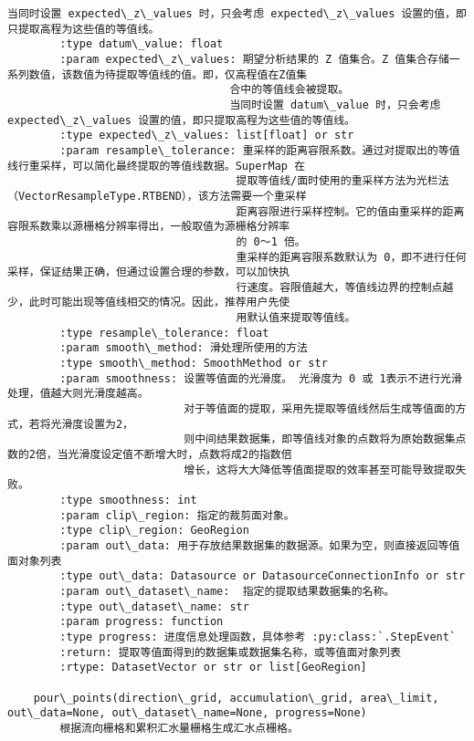 \documentclass[11pt]{article}
\begin{document}
\begin{Verbatim}[commandchars=\\\{\}]
                            当同时设置 expected\_z\_values 时，只会考虑 expected\_z\_values 设置的值，即只提取高程为这些值的等值线。
        :type datum\_value: float
        :param expected\_z\_values: 期望分析结果的 Z 值集合。Z 值集合存储一系列数值，该数值为待提取等值线的值。即，仅高程值在Z值集
                                  合中的等值线会被提取。
                                  当同时设置 datum\_value 时，只会考虑 expected\_z\_values 设置的值，即只提取高程为这些值的等值线。
        :type expected\_z\_values: list[float] or str
        :param resample\_tolerance: 重采样的距离容限系数。通过对提取出的等值线行重采样，可以简化最终提取的等值线数据。SuperMap 在
                                   提取等值线/面时使用的重采样方法为光栏法（VectorResampleType.RTBEND），该方法需要一个重采样
                                   距离容限进行采样控制。它的值由重采样的距离容限系数乘以源栅格分辨率得出，一般取值为源栅格分辨率
                                   的 0～1 倍。
                                   重采样的距离容限系数默认为 0，即不进行任何采样，保证结果正确，但通过设置合理的参数，可以加快执
                                   行速度。容限值越大，等值线边界的控制点越少，此时可能出现等值线相交的情况。因此，推荐用户先使
                                   用默认值来提取等值线。
        :type resample\_tolerance: float
        :param smooth\_method: 滑处理所使用的方法
        :type smooth\_method: SmoothMethod or str
        :param smoothness: 设置等值面的光滑度。 光滑度为 0 或 1表示不进行光滑处理，值越大则光滑度越高。
                           对于等值面的提取，采用先提取等值线然后生成等值面的方式，若将光滑度设置为2，
                           则中间结果数据集，即等值线对象的点数将为原始数据集点数的2倍，当光滑度设定值不断增大时，点数将成2的指数倍
                           增长，这将大大降低等值面提取的效率甚至可能导致提取失败。
        :type smoothness: int
        :param clip\_region: 指定的裁剪面对象。
        :type clip\_region: GeoRegion
        :param out\_data: 用于存放结果数据集的数据源。如果为空，则直接返回等值面对象列表
        :type out\_data: Datasource or DatasourceConnectionInfo or str
        :param out\_dataset\_name:  指定的提取结果数据集的名称。
        :type out\_dataset\_name: str
        :param progress: function
        :type progress: 进度信息处理函数，具体参考 :py:class:`.StepEvent`
        :return: 提取等值面得到的数据集或数据集名称，或等值面对象列表
        :rtype: DatasetVector or str or list[GeoRegion]
    
    pour\_points(direction\_grid, accumulation\_grid, area\_limit, out\_data=None, out\_dataset\_name=None, progress=None)
        根据流向栅格和累积汇水量栅格生成汇水点栅格。
        

\end{Verbatim}
\end{document}
